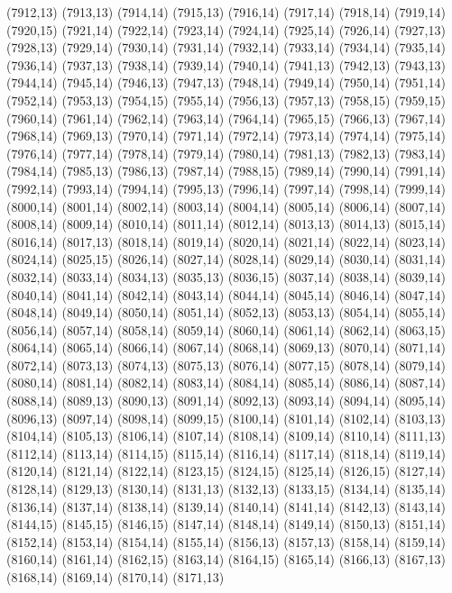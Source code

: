 (7912,13)
(7913,13)
(7914,14)
(7915,13)
(7916,14)
(7917,14)
(7918,14)
(7919,14)
(7920,15)
(7921,14)
(7922,14)
(7923,14)
(7924,14)
(7925,14)
(7926,14)
(7927,13)
(7928,13)
(7929,14)
(7930,14)
(7931,14)
(7932,14)
(7933,14)
(7934,14)
(7935,14)
(7936,14)
(7937,13)
(7938,14)
(7939,14)
(7940,14)
(7941,13)
(7942,13)
(7943,13)
(7944,14)
(7945,14)
(7946,13)
(7947,13)
(7948,14)
(7949,14)
(7950,14)
(7951,14)
(7952,14)
(7953,13)
(7954,15)
(7955,14)
(7956,13)
(7957,13)
(7958,15)
(7959,15)
(7960,14)
(7961,14)
(7962,14)
(7963,14)
(7964,14)
(7965,15)
(7966,13)
(7967,14)
(7968,14)
(7969,13)
(7970,14)
(7971,14)
(7972,14)
(7973,14)
(7974,14)
(7975,14)
(7976,14)
(7977,14)
(7978,14)
(7979,14)
(7980,14)
(7981,13)
(7982,13)
(7983,14)
(7984,14)
(7985,13)
(7986,13)
(7987,14)
(7988,15)
(7989,14)
(7990,14)
(7991,14)
(7992,14)
(7993,14)
(7994,14)
(7995,13)
(7996,14)
(7997,14)
(7998,14)
(7999,14)
(8000,14)
(8001,14)
(8002,14)
(8003,14)
(8004,14)
(8005,14)
(8006,14)
(8007,14)
(8008,14)
(8009,14)
(8010,14)
(8011,14)
(8012,14)
(8013,13)
(8014,13)
(8015,14)
(8016,14)
(8017,13)
(8018,14)
(8019,14)
(8020,14)
(8021,14)
(8022,14)
(8023,14)
(8024,14)
(8025,15)
(8026,14)
(8027,14)
(8028,14)
(8029,14)
(8030,14)
(8031,14)
(8032,14)
(8033,14)
(8034,13)
(8035,13)
(8036,15)
(8037,14)
(8038,14)
(8039,14)
(8040,14)
(8041,14)
(8042,14)
(8043,14)
(8044,14)
(8045,14)
(8046,14)
(8047,14)
(8048,14)
(8049,14)
(8050,14)
(8051,14)
(8052,13)
(8053,13)
(8054,14)
(8055,14)
(8056,14)
(8057,14)
(8058,14)
(8059,14)
(8060,14)
(8061,14)
(8062,14)
(8063,15)
(8064,14)
(8065,14)
(8066,14)
(8067,14)
(8068,14)
(8069,13)
(8070,14)
(8071,14)
(8072,14)
(8073,13)
(8074,13)
(8075,13)
(8076,14)
(8077,15)
(8078,14)
(8079,14)
(8080,14)
(8081,14)
(8082,14)
(8083,14)
(8084,14)
(8085,14)
(8086,14)
(8087,14)
(8088,14)
(8089,13)
(8090,13)
(8091,14)
(8092,13)
(8093,14)
(8094,14)
(8095,14)
(8096,13)
(8097,14)
(8098,14)
(8099,15)
(8100,14)
(8101,14)
(8102,14)
(8103,13)
(8104,14)
(8105,13)
(8106,14)
(8107,14)
(8108,14)
(8109,14)
(8110,14)
(8111,13)
(8112,14)
(8113,14)
(8114,15)
(8115,14)
(8116,14)
(8117,14)
(8118,14)
(8119,14)
(8120,14)
(8121,14)
(8122,14)
(8123,15)
(8124,15)
(8125,14)
(8126,15)
(8127,14)
(8128,14)
(8129,13)
(8130,14)
(8131,13)
(8132,13)
(8133,15)
(8134,14)
(8135,14)
(8136,14)
(8137,14)
(8138,14)
(8139,14)
(8140,14)
(8141,14)
(8142,13)
(8143,14)
(8144,15)
(8145,15)
(8146,15)
(8147,14)
(8148,14)
(8149,14)
(8150,13)
(8151,14)
(8152,14)
(8153,14)
(8154,14)
(8155,14)
(8156,13)
(8157,13)
(8158,14)
(8159,14)
(8160,14)
(8161,14)
(8162,15)
(8163,14)
(8164,15)
(8165,14)
(8166,13)
(8167,13)
(8168,14)
(8169,14)
(8170,14)
(8171,13)
